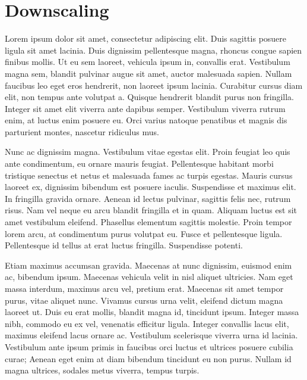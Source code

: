 \documentclass[
  letterpaper,
  DIV=11,
  numbers=noendperiod]{scrreprt}
\begin{document}

\chapter{Downscaling}\label{downscaling}

Lorem ipsum dolor sit amet, consectetur adipiscing elit. Duis sagittis
posuere ligula sit amet lacinia. Duis dignissim pellentesque magna,
rhoncus congue sapien finibus mollis. Ut eu sem laoreet, vehicula ipsum
in, convallis erat. Vestibulum magna sem, blandit pulvinar augue sit
amet, auctor malesuada sapien. Nullam faucibus leo eget eros hendrerit,
non laoreet ipsum lacinia. Curabitur cursus diam elit, non tempus ante
volutpat a. Quisque hendrerit blandit purus non fringilla. Integer sit
amet elit viverra ante dapibus semper. Vestibulum viverra rutrum enim,
at luctus enim posuere eu. Orci varius natoque penatibus et magnis dis
parturient montes, nascetur ridiculus mus.

Nunc ac dignissim magna. Vestibulum vitae egestas elit. Proin feugiat
leo quis ante condimentum, eu ornare mauris feugiat. Pellentesque
habitant morbi tristique senectus et netus et malesuada fames ac turpis
egestas. Mauris cursus laoreet ex, dignissim bibendum est posuere
iaculis. Suspendisse et maximus elit. In fringilla gravida ornare.
Aenean id lectus pulvinar, sagittis felis nec, rutrum risus. Nam vel
neque eu arcu blandit fringilla et in quam. Aliquam luctus est sit amet
vestibulum eleifend. Phasellus elementum sagittis molestie. Proin tempor
lorem arcu, at condimentum purus volutpat eu. Fusce et pellentesque
ligula. Pellentesque id tellus at erat luctus fringilla. Suspendisse
potenti.

Etiam maximus accumsan gravida. Maecenas at nunc dignissim, euismod enim
ac, bibendum ipsum. Maecenas vehicula velit in nisl aliquet ultricies.
Nam eget massa interdum, maximus arcu vel, pretium erat. Maecenas sit
amet tempor purus, vitae aliquet nunc. Vivamus cursus urna velit,
eleifend dictum magna laoreet ut. Duis eu erat mollis, blandit magna id,
tincidunt ipsum. Integer massa nibh, commodo eu ex vel, venenatis
efficitur ligula. Integer convallis lacus elit, maximus eleifend lacus
ornare ac. Vestibulum scelerisque viverra urna id lacinia. Vestibulum
ante ipsum primis in faucibus orci luctus et ultrices posuere cubilia
curae; Aenean eget enim at diam bibendum tincidunt eu non purus. Nullam
id magna ultrices, sodales metus viverra, tempus turpis.
\end{document}

